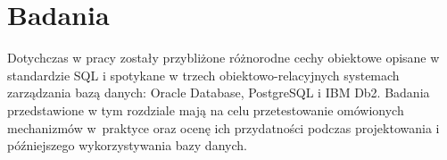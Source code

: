 \documentclass[a4paper,twoside,12pt]{book}
\begin{document}
 
\chapter{Badania}

Dotychczas w pracy zostały przybliżone różnorodne cechy obiektowe opisane w standardzie SQL i spotykane w trzech obiektowo-relacyjnych systemach zarządzania bazą danych: Oracle Database, PostgreSQL i IBM Db2. Badania przedstawione w tym rozdziale mają na celu przetestowanie omówionych mechanizmów w~praktyce oraz ocenę ich przydatności podczas projektowania i późniejszego wykorzystywania bazy danych.
\end{document}
